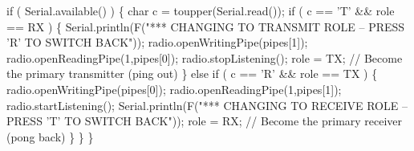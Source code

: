 \begin{DoxyCodeInclude}
  \textcolor{keywordflow}{if} ( Serial.available() )
  \{
    \textcolor{keywordtype}{char} c = toupper(Serial.read());
    \textcolor{keywordflow}{if} ( c == \textcolor{charliteral}{'T'} && role == RX )
    \{
      Serial.println(F(\textcolor{stringliteral}{"*** CHANGING TO TRANSMIT ROLE -- PRESS 'R' TO SWITCH BACK"}));
      radio.openWritingPipe(pipes[1]);
      radio.openReadingPipe(1,pipes[0]);
      radio.stopListening();
      role = TX;                  \textcolor{comment}{// Become the primary transmitter (ping out)}
    \}
    \textcolor{keywordflow}{else} \textcolor{keywordflow}{if} ( c == \textcolor{charliteral}{'R'} && role == TX )
    \{
      radio.openWritingPipe(pipes[0]);
      radio.openReadingPipe(1,pipes[1]); 
      radio.startListening();
      Serial.println(F(\textcolor{stringliteral}{"*** CHANGING TO RECEIVE ROLE -- PRESS 'T' TO SWITCH BACK"}));
      role = RX;                \textcolor{comment}{// Become the primary receiver (pong back)}
    \}
  \}
\}
\end{DoxyCodeInclude}
 